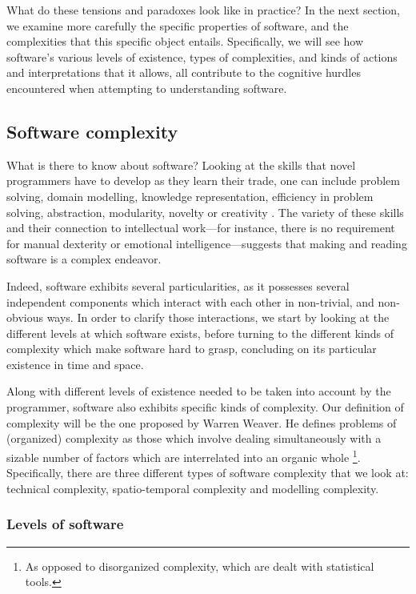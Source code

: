 What do these tensions and paradoxes look like in practice? In the next section, we examine more carefully the specific properties of software, and the complexities that this specific object entails. Specifically, we will see how software's various levels of existence, types of complexities, and kinds of actions and interpretations that it allows, all contribute to the cognitive hurdles encountered when attempting to understanding software.

\subsection{Software complexity}
\label{subsec:software-complexity}

What is there to know about software? Looking at the skills that novel programmers have to develop as they learn their trade, one can include problem solving, domain modelling, knowledge representation, efficiency in problem solving, abstraction, modularity, novelty or creativity \citep{fuller_developing_2007}. The variety of these skills and their connection to intellectual work—for instance, there is no requirement for manual dexterity or emotional intelligence—suggests that making and reading software is a complex endeavor.

Indeed, software exhibits several particularities, as it possesses several independent components which interact with each other in non-trivial, and non-obvious ways. In order to clarify those interactions, we start by looking at the different levels at which software exists, before turning to the different kinds of complexity which make software hard to grasp, concluding on its particular existence in time and space.

Along with different levels of existence needed to be taken into account by the programmer, software also exhibits specific kinds of complexity. Our definition of complexity will be the one proposed by Warren Weaver. He defines problems of (organized) complexity as those which involve dealing simultaneously with a sizable number of factors which are interrelated into an organic whole \citep{weaver_science_1948}\footnote{As opposed to disorganized complexity, which are dealt with statistical tools.}. Specifically, there are three different types of software complexity that we look at: technical complexity, spatio-temporal complexity and modelling complexity.

\subsubsection{Levels of software}
\label{subsubsec:levels-software}


